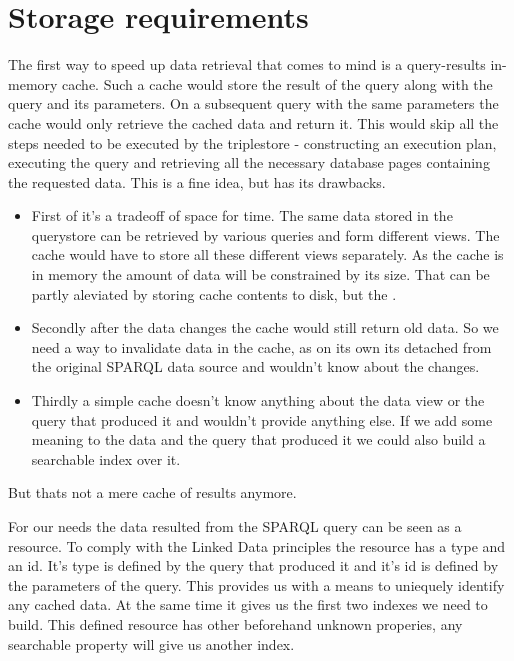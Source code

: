 \section{Storage requirements}
\label{sec:StorageRequirements}
The first way to speed up data retrieval that comes to mind is a query-results in-memory cache. Such a cache would store the result of the query along with the query and its parameters. On a subsequent query with the same parameters the cache would only retrieve the cached data and return it. This would skip all the steps needed to be executed by the triplestore - constructing an execution plan, executing the query and retrieving all the necessary database pages containing the requested data. This is a fine idea, but has its drawbacks.
\begin{itemize}
	\item First of it's a tradeoff of space for time. The same data stored in the querystore can be retrieved by various queries and form different views. The cache would have to store all these different views separately. As the cache is in memory the amount of data will be constrained by its size. That can be partly aleviated by storing cache contents to disk, but the .
	\item Secondly after the data changes the cache would still return old data. So we need a way to invalidate data in the cache, as on its own its detached from the original SPARQL data source and wouldn't know about the changes.
	\item Thirdly a simple cache doesn't know anything about the data view or the query that produced it and wouldn't provide anything else. If we add some meaning to the data and the query that produced it we could also build a searchable index over it.
\end{itemize}
But thats not a mere cache of results anymore.

For our needs the data resulted from the SPARQL query can be seen as a resource. To comply with the Linked Data principles the resource has a type and an id. It's type is defined by the query that produced it and it's id is defined by the parameters of the query. This provides us with a means to uniequely identify any cached data. At the same time it gives us the first two indexes we need to build. This defined resource has other beforehand unknown properies, any searchable property will give us another index.

